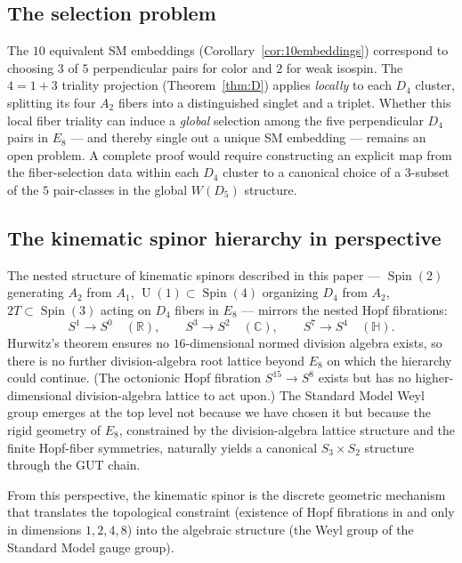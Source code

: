 \documentclass[11pt,reqno]{amsart}
\theoremstyle{plain}
\theoremstyle{definition}
\theoremstyle{remark}
\newcommand{\R}{\mathbb{R}}
\newcommand{\C}{\mathbb{C}}
\newcommand{\HH}{\mathbb{H}}
\DeclareMathOperator{\Spin}{Spin}
\DeclareMathOperator{\U}{U}
\begin{document}
\subsection{The selection problem}\label{sec:selection}

The $10$ equivalent SM embeddings
(Corollary~\ref{cor:10embeddings})
correspond to choosing $3$ of $5$ perpendicular pairs for color
and $2$ for weak isospin.
The $4 = 1 + 3$ triality projection
(Theorem~\ref{thm:D}) applies \emph{locally} to each $D_4$
cluster, splitting its four $A_2$ fibers into a distinguished
singlet and a triplet.
Whether this local fiber triality can induce a \emph{global}
selection among the five perpendicular $D_4$ pairs in $E_8$
--- and thereby single out a unique SM embedding --- remains
an open problem.
A complete proof would require constructing an explicit map
from the fiber-selection data within each $D_4$ cluster to a
canonical choice of a $3$-subset of the $5$ pair-classes in
the global $W(D_5)$ structure.

\subsection{The kinematic spinor hierarchy in perspective}

The nested structure of kinematic spinors described in this
paper --- $\Spin(2)$ generating $A_2$ from $A_1$,
$\U(1) \subset \Spin(4)$ organizing $D_4$ from $A_2$,
$2T \subset \Spin(3)$ acting on $D_4$ fibers in $E_8$ ---
mirrors the nested Hopf fibrations:
\[
  S^1 \to S^0 \quad(\R),\qquad
  S^3 \to S^2 \quad(\C),\qquad
  S^7 \to S^4 \quad(\HH).
\]
Hurwitz's theorem \cite{Hurwitz1898} ensures no
$16$-dimensional normed division algebra exists, so there is
no further division-algebra root lattice beyond $E_8$ on which
the hierarchy could continue.
(The octonionic Hopf fibration $S^{15} \to S^8$ exists
but has no higher-dimensional division-algebra lattice to act upon.)
The Standard Model Weyl group emerges at the top level not
because we have chosen it but because the rigid geometry of
$E_8$, constrained by the division-algebra lattice structure
and the finite Hopf-fiber symmetries, naturally yields a
canonical $S_3 \times S_2$ structure through the GUT chain.

From this perspective, the kinematic spinor is the discrete
geometric mechanism that translates the topological constraint
(existence of Hopf fibrations in and only in dimensions
$1, 2, 4, 8$) into the algebraic structure (the Weyl group
of the Standard Model gauge group).
\end{document}
